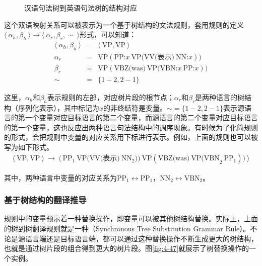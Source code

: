 \begin{figure}[htp]
\centering

\caption{汉语句法树到英语句法树的结构对应}
\label{fig:4-46}
\end{figure}

\parinterval 这个双语映射关系可以被表示为一个基于树结构的文法规则，套用规则的定义$\langle\  \alpha_h, \beta_h\ \rangle \to \langle\ \alpha_r, \beta_r, \sim\ \rangle$形式，可以知道：
\begin{eqnarray}
\langle\ \alpha_h, \beta_h\ \rangle &=& \langle\ \textrm{VP}, \textrm{VP}\ \rangle \nonumber \\
\alpha_r &=& \textrm{VP}(\textrm{PP:}x\ \textrm{VP(VV(表示)}\ \textrm{NN:}x)) \nonumber \\
\beta_r &=& \textrm{VP}(\textrm{VBZ(was)}\ \textrm{VP(VBN:}x\ \textrm{PP:}x)) \nonumber \\
\sim &=& \{1-2,2-1\} \nonumber
\end{eqnarray}

\parinterval 这里，$\alpha_h$和$\beta_h$表示规则的左部，对应树片段的根节点；$\alpha_r$和$\beta_r$是两种语言的树结构（序列化表示），其中标记为$x$的非终结符是变量。$\sim = \{1-2,2-1\}$表示源语言的第一个变量对应目标语言的第二个变量，而源语言的第二个变量对应目标语言的第一个变量，这也反应出两种语言句法结构中的调序现象。有时候为了化简规则的形式，会把规则中变量的对应关系用下标进行表示。例如，上面的规则也可以被写为如下形式。
\begin{eqnarray}
\langle\ \textrm{VP}, \textrm{VP}\ \rangle\ \to\ \langle\ \textrm{PP}_{1} \ \textrm{VP(VV(表示)}\ \textrm{NN}_{2}))\ \textrm{VP}(\textrm{VBZ(was)}\ \textrm{VP(VBN}_{2} \ \textrm{PP}_{1})) \ \rangle \nonumber
\end{eqnarray}

\noindent 其中，两种语言中变量的对应关系为$\textrm{PP}_1 \leftrightarrow \textrm{PP}_1$，$\textrm{NN}_2 \leftrightarrow \textrm{VBN}_2$。


\subsubsection{基于树结构的翻译推导}

\parinterval 规则中的变量预示着一种替换操作，即变量可以被其他树结构替换。实际上，上面的树到树翻译规则就是一种{\small{}}（Synchronous Tree Substitution Grammar Rule）。不论是源语言端还是目标语言端，都可以通过这种替换操作不断生成更大的树结构，也就是通过树片段的组合得到更大的树片段。图\ref{fig:4-47}就展示了树替换操作的一个实例。

